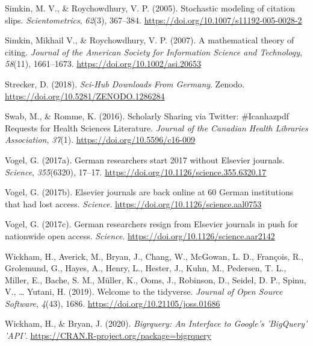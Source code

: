 \documentclass[
]{article}
\newlength{\cslhangindent}
\newlength{\cslentryspacingunit} %
\newenvironment{CSLReferences}[2] %
 {%
  \setlength{\parindent}{0pt}
  \ifodd #1
  \let\oldpar\par
  \def\par{\hangindent=\cslhangindent\oldpar}
  \fi
  \setlength{\parskip}{#2\cslentryspacingunit}
 }%
 {}
\begin{document}
\begin{CSLReferences}{1}{0}
\leavevmode{}%
Simkin, M. V., \& Roychowdhury, V. P. (2005). Stochastic modeling of citation slips. \emph{Scientometrics}, \emph{62}(3), 367--384. \url{https://doi.org/10.1007/s11192-005-0028-2}

\leavevmode{}%
Simkin, Mikhail V., \& Roychowdhury, V. P. (2007). A mathematical theory of citing. \emph{Journal of the American Society for Information Science and Technology}, \emph{58}(11), 1661--1673. \url{https://doi.org/10.1002/asi.20653}

\leavevmode{}%
Strecker, D. (2018). \emph{Sci-{Hub} {Downloads} {From} {Germany}}. Zenodo. \url{https://doi.org/10.5281/ZENODO.1286284}

\leavevmode{}%
Swab, M., \& Romme, K. (2016). Scholarly {Sharing} via {Twitter}: \#Icanhazpdf {Requests} for {Health} {Sciences} {Literature}. \emph{Journal of the Canadian Health Libraries Association}, \emph{37}(1). \url{https://doi.org/10.5596/c16-009}

\leavevmode{}%
Vogel, G. (2017a). German researchers start 2017 without {Elsevier} journals. \emph{Science}, \emph{355}(6320), 17--17. \url{https://doi.org/10.1126/science.355.6320.17}

\leavevmode{}%
Vogel, G. (2017b). Elsevier journals are back online at 60 {German} institutions that had lost access. \emph{Science}. \url{https://doi.org/10.1126/science.aal0753}

\leavevmode{}%
Vogel, G. (2017c). German researchers resign from {Elsevier} journals in push for nationwide open access. \emph{Science}. \url{https://doi.org/10.1126/science.aar2142}

\leavevmode{}%
Wickham, H., Averick, M., Bryan, J., Chang, W., McGowan, L. D., François, R., Grolemund, G., Hayes, A., Henry, L., Hester, J., Kuhn, M., Pedersen, T. L., Miller, E., Bache, S. M., Müller, K., Ooms, J., Robinson, D., Seidel, D. P., Spinu, V., \ldots{} Yutani, H. (2019). Welcome to the tidyverse. \emph{Journal of Open Source Software}, \emph{4}(43), 1686. \url{https://doi.org/10.21105/joss.01686}

\leavevmode{}%
Wickham, H., \& Bryan, J. (2020). \emph{Bigrquery: {An} {Interface} to {Google}'s '{BigQuery}' '{API}'}. \url{https://CRAN.R-project.org/package=bigrquery}

\end{CSLReferences}
\end{document}
